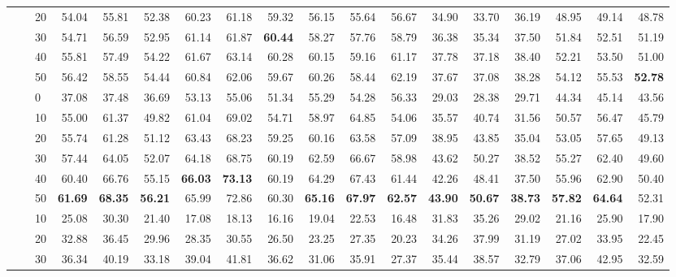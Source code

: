 \begin{table*}[!h]
{\begin{tabular}{lllrrr|rrr|rrr|rrr|rrr}
 \textbf{} & \textbf{} & 20 & 54.04 & 55.81 & 52.38 & 60.23 & 61.18 & 59.32 & 56.15 & 55.64 & 56.67 & 34.90 & 33.70 & 36.19 & 48.95 & 49.14 & 48.78 \\ 
 \textbf{} & \textbf{} & 30 & 54.71 & 56.59 & 52.95 & 61.14 & 61.87 & \textbf{60.44} & 58.27 & 57.76 & 58.79 & 36.38 & 35.34 & 37.50 & 51.84 & 52.51 & 51.19 \\ 
 \textbf{} & \textbf{} & 40 & 55.81 & 57.49 & 54.22 & 61.67 & 63.14 & 60.28 & 60.15 & 59.16 & 61.17 & 37.78 & 37.18 & 38.40 & 52.21 & 53.50 & 51.00 \\ 
 \textbf{} & \textbf{} & 50 & 56.42 & 58.55 & 54.44 & 60.84 & 62.06 & 59.67 & 60.26 & 58.44 & 62.19 & 37.67 & 37.08 & 38.28 & 54.12 & 55.53 & \textbf{52.78} \\ 
 \arrayrulecolor{gray}\cline{2-18}\arrayrulecolor{black}
\textbf{} & \textbf{\multirow{6}{*}{SC}} & 0 & 37.08 & 37.48 & 36.69 & 53.13 & 55.06 & 51.34 & 55.29 & 54.28 & 56.33 & 29.03 & 28.38 & 29.71 & 44.34 & 45.14 & 43.56 \\ 
 \textbf{} & \textbf{} & 10 & 55.00 & 61.37 & 49.82 & 61.04 & 69.02 & 54.71 & 58.97 & 64.85 & 54.06 & 35.57 & 40.74 & 31.56 & 50.57 & 56.47 & 45.79 \\ 
 \textbf{} & \textbf{} & 20 & 55.74 & 61.28 & 51.12 & 63.43 & 68.23 & 59.25 & 60.16 & 63.58 & 57.09 & 38.95 & 43.85 & 35.04 & 53.05 & 57.65 & 49.13 \\ 
 \textbf{} & \textbf{} & 30 & 57.44 & 64.05 & 52.07 & 64.18 & 68.75 & 60.19 & 62.59 & 66.67 & 58.98 & 43.62 & 50.27 & 38.52 & 55.27 & 62.40 & 49.60 \\ 
 \textbf{} & \textbf{} & 40 & 60.40 & 66.76 & 55.15 & \textbf{66.03} & \textbf{73.13} & 60.19 & 64.29 & 67.43 & 61.44 & 42.26 & 48.41 & 37.50 & 55.96 & 62.90 & 50.40 \\ 
 \textbf{} & \textbf{} & 50 & \textbf{61.69} & \textbf{68.35} & \textbf{56.21} & 65.99 & 72.86 & 60.30 & \textbf{65.16} & \textbf{67.97} & \textbf{62.57} & \textbf{43.90} & \textbf{50.67} & \textbf{38.73} & \textbf{57.82} & \textbf{64.64} & 52.31 \\ 
\hline
\hline
\textbf{\multirow{7}{*}{MVP \citep{gou2023mvp}}} & \textbf{\multirow{21}{*}{-}} & 10 & 25.08 & 30.30 & 21.40 & 17.08 & 18.13 & 16.16 & 19.04 & 22.53 & 16.48 & 31.83 & 35.26 & 29.02 & 21.16 & 25.90 & 17.90 \\ 
 \textbf{} & \textbf{} & 20 & 32.88 & 36.45 & 29.96 & 28.35 & 30.55 & 26.50 & 23.25 & 27.35 & 20.23 & 34.26 & 37.99 & 31.19 & 27.02 & 33.95 & 22.45 \\ 
 \textbf{} & \textbf{} & 30 & 36.34 & 40.19 & 33.18 & 39.04 & 41.81 & 36.62 & 31.06 & 35.91 & 27.37 & 35.44 & 38.57 & 32.79 & 37.06 & 42.95 & 32.59 \\ 

\end{tabular}}
\end{table*}

